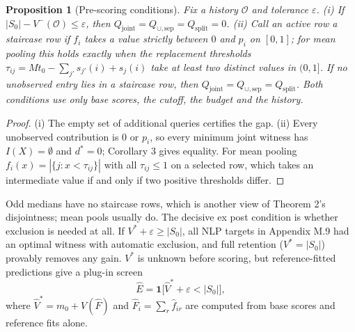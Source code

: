 \documentclass[11pt]{article}
\newtheorem{proposition}{Proposition}
\newcommand{\Qj}{Q_{\mathrm{joint}}}
\newcommand{\Qu}{Q_{\cup,\mathrm{sep}}}
\newcommand{\Qs}{Q_{\mathrm{split}}}
\newcommand{\Sz}{S_0}
\newcommand{\ind}{\mathbf{1}}
\begin{document}
\begin{proposition}[Pre-scoring conditions]
\label{prop:prescore}
Fix a history $\mathcal O$ and tolerance $\varepsilon$. (i) If $|\Sz|-V^-(\mathcal O)\le\varepsilon$, then $\Qj=\Qu=\Qs=0$. (ii) Call an active row a \emph{staircase row} if $f_i$ takes a value strictly between $0$ and $p_i$ on $[0,1]$; for mean pooling this holds exactly when the replacement thresholds $\tau_{ij}=Mt_0-\sum_{j'}s_{j'}(i)+s_j(i)$ take at least two distinct values in $(0,1]$. If no unobserved entry lies in a staircase row, then $\Qj=\Qu=\Qs$. Both conditions use only base scores, the cutoff, the budget and the history.
\end{proposition}
\begin{proof}
(i) The empty set of additional queries certifies the gap. (ii) Every unobserved contribution is $0$ or $p_i$, so every minimum joint witness has $I(X)=\emptyset$ and $d^*=0$; Corollary 3 gives equality. For mean pooling $f_i(x)=|\{j:x<\tau_{ij}\}|$ with all $\tau_{ij}\le1$ on a selected row, which takes an intermediate value if and only if two positive thresholds differ.
\end{proof}
Odd medians have no staircase rows, which is another view of Theorem 2's disjointness; mean pools usually do. The decisive ex post condition is whether exclusion is needed at all. If $V^*+\varepsilon\ge|\Sz|$, all NLP targets in Appendix M.9 had an optimal witness with automatic exclusion, and full retention ($V^*=|\Sz|$) provably removes any gain. $V^*$ is unknown before scoring, but reference-fitted predictions give a plug-in screen
\[
\hat E=\ind\big[\hat V^*+\varepsilon<|\Sz|\big],
\]
where $\hat V^*=m_0+V(\hat F)$ and $\hat F_i=\sum_r\hat f_{ir}$ are
computed from base scores and reference fits alone.
\end{document}
